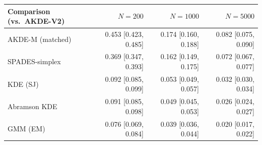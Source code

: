 \begin{tabular}{lrrr}
\toprule
Comparison (vs.\ AKDE-V2) & $N=200$ & $N=1000$ & $N=5000$ \\
\midrule
AKDE-M (matched) & 0.453 [0.423, 0.485] & 0.174 [0.160, 0.188] & 0.082 [0.075, 0.090] \\
SPADES-simplex & 0.369 [0.347, 0.393] & 0.162 [0.149, 0.175] & 0.072 [0.067, 0.077] \\
KDE (SJ) & 0.092 [0.085, 0.099] & 0.053 [0.049, 0.057] & 0.032 [0.030, 0.034] \\
Abramson KDE & 0.091 [0.085, 0.098] & 0.049 [0.045, 0.053] & 0.026 [0.024, 0.027] \\
GMM (EM) & 0.076 [0.069, 0.084] & 0.039 [0.036, 0.044] & 0.020 [0.017, 0.022] \\
\bottomrule
\end{tabular}